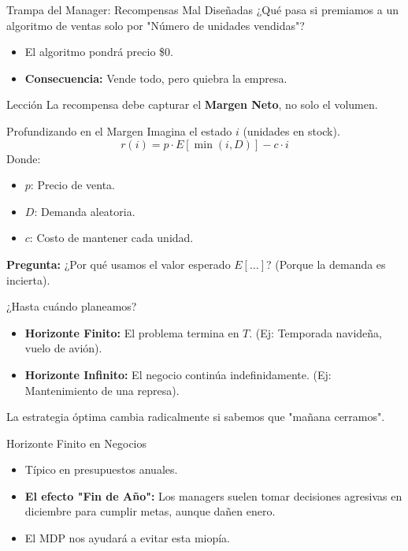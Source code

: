 \documentclass{beamer}
\begin{document}
\begin{frame}{Trampa del Manager: Recompensas Mal Diseñadas}
¿Qué pasa si premiamos a un algoritmo de ventas solo por "Número de unidades vendidas"?
\pause
\begin{itemize}
    \item El algoritmo pondrá precio \$0.
    \item \textbf{Consecuencia:} Vende todo, pero quiebra la empresa.
\end{itemize}
\vspace{0.3cm}
\begin{block}{Lección}
La recompensa debe capturar el \textbf{Margen Neto}, no solo el volumen.
\end{block}
\end{frame}

\begin{frame}{Profundizando en el Margen}
Imagina el estado $i$ (unidades en stock).
\[ r(i) = p \cdot E[\min(i, D)] - c \cdot i \]
Donde:
\begin{itemize}
    \item $p$: Precio de venta.
    \item $D$: Demanda aleatoria.
    \item $c$: Costo de mantener cada unidad.
\end{itemize}
\vspace{0.3cm}
\textbf{Pregunta:} ¿Por qué usamos el valor esperado $E[\dots]$? (Porque la demanda es incierta).
\end{frame}

\begin{frame}{¿Hasta cuándo planeamos?}
\begin{itemize}
    \item \textbf{Horizonte Finito:} El problema termina en $T$. (Ej: Temporada navideña, vuelo de avión).
    \item \textbf{Horizonte Infinito:} El negocio continúa indefinidamente. (Ej: Mantenimiento de una represa).
\end{itemize}
\vspace{0.3cm}
La estrategia óptima cambia radicalmente si sabemos que "mañana cerramos".
\end{frame}

\begin{frame}{Horizonte Finito en Negocios}
\begin{itemize}
    \item Típico en presupuestos anuales.
    \item \textbf{El efecto "Fin de Año":} Los managers suelen tomar decisiones agresivas en diciembre para cumplir metas, aunque dañen enero.
    \item El MDP nos ayudará a evitar esta miopía.
\end{itemize}
\end{frame}
\end{document}
